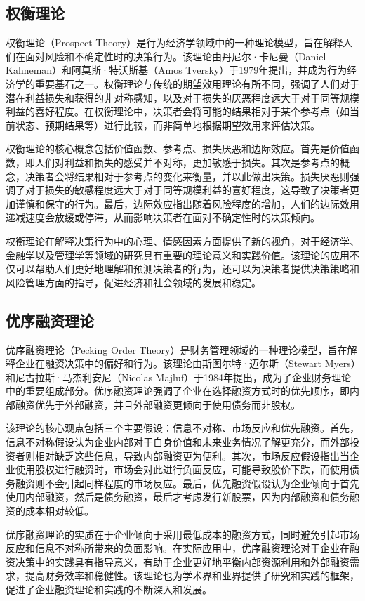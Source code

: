 \subsection{权衡理论}
权衡理论（Prospect Theory）是行为经济学领域中的一种理论模型，旨在解释人们在面对风险和不确定性时的决策行为。该理论由丹尼尔·卡尼曼（Daniel Kahneman）和阿莫斯·特沃斯基（Amos Tversky）于1979年提出，并成为行为经济学的重要基石之一。权衡理论与传统的期望效用理论有所不同，强调了人们对于潜在利益损失和获得的非对称感知，以及对于损失的厌恶程度远大于对于同等规模利益的喜好程度。在权衡理论中，决策者会将可能的结果相对于某个参考点（如当前状态、预期结果等）进行比较，而非简单地根据期望效用来评估决策。

权衡理论的核心概念包括价值函数、参考点、损失厌恶和边际效应。首先是价值函数，即人们对利益和损失的感受并不对称，更加敏感于损失。其次是参考点的概念，决策者会将结果相对于参考点的变化来衡量，并以此做出决策。损失厌恶则强调了对于损失的敏感程度远大于对于同等规模利益的喜好程度，这导致了决策者更加谨慎和保守的行为。最后，边际效应指出随着风险程度的增加，人们的边际效用递减速度会放缓或停滞，从而影响决策者在面对不确定性时的决策倾向。\cite{Liu2022}

权衡理论在解释决策行为中的心理、情感因素方面提供了新的视角，对于经济学、金融学以及管理学等领域的研究具有重要的理论意义和实践价值。该理论的应用不仅可以帮助人们更好地理解和预测决策者的行为，还可以为决策者提供决策策略和风险管理方面的指导，促进经济和社会领域的发展和稳定。
\subsection{优序融资理论}
优序融资理论（Pecking Order Theory）是财务管理领域的一种理论模型，旨在解释企业在融资决策中的偏好和行为。该理论由斯图尔特·迈尔斯（Stewart Myers）和尼古拉斯·马杰利安尼（Nicolas Majluf）于1984年提出，成为了企业财务理论中的重要组成部分。优序融资理论强调了企业在选择融资方式时的优先顺序，即内部融资优先于外部融资，并且外部融资更倾向于使用债务而非股权。\cite{Hong2015}

该理论的核心观点包括三个主要假设：信息不对称、市场反应和优先融资。首先，信息不对称假设认为企业内部对于自身价值和未来业务情况了解更充分，而外部投资者则相对缺乏这些信息，导致内部融资更为便利。其次，市场反应假设指出当企业使用股权进行融资时，市场会对此进行负面反应，可能导致股价下跌，而使用债务融资则不会引起同样程度的市场反应。最后，优先融资假设认为企业倾向于首先使用内部融资，然后是债务融资，最后才考虑发行新股票，因为内部融资和债务融资的成本相对较低。\cite{Cao2018}

优序融资理论的实质在于企业倾向于采用最低成本的融资方式，同时避免引起市场反应和信息不对称所带来的负面影响。在实际应用中，优序融资理论对于企业在融资决策中的实践具有指导意义，有助于企业更好地平衡内部资源利用和外部融资需求，提高财务效率和稳健性。该理论也为学术界和业界提供了研究和实践的框架，促进了企业融资理论和实践的不断深入和发展。
